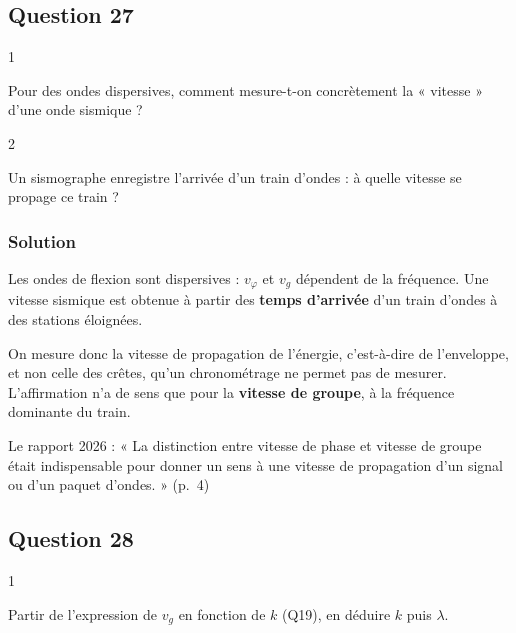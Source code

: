 \documentclass[11pt,a4paper]{article}
\begin{document}
\hypertarget{question-27}{%
\subsection{Question 27}\label{question-27}}

\begin{indication}{1}

Pour des ondes dispersives, comment mesure-t-on concrètement la « vitesse » d'une onde sismique ?

\end{indication}

\begin{indication}{2}

Un sismographe enregistre l'arrivée d'un train d'ondes : à quelle vitesse se propage ce train ?

\end{indication}

\hypertarget{solution-26}{%
\subsubsection{Solution}\label{solution-26}}

Les ondes de flexion sont dispersives : \(v_\varphi\) et \(v_g\) dépendent de la fréquence. Une vitesse sismique est obtenue à partir des \textbf{temps d'arrivée} d'un train d'ondes à des stations éloignées.

On mesure donc la vitesse de propagation de l'énergie, c'est-à-dire de l'enveloppe, et non celle des crêtes, qu'un chronométrage ne permet pas de mesurer. L'affirmation n'a de sens que pour la \textbf{vitesse de groupe}, à la fréquence dominante du train.

\begin{jury}

Le rapport 2026 : « La distinction entre vitesse de phase et vitesse de groupe était indispensable pour donner un sens à une vitesse de propagation d'un signal ou d'un paquet d'ondes. » (p.~4)

\end{jury}

\hypertarget{question-28}{%
\subsection{Question 28}\label{question-28}}

\begin{indication}{1}

Partir de l'expression de \(v_g\) en fonction de \(k\) (Q19), en déduire \(k\) puis \(\lambda\).

\end{indication}
\end{document}

